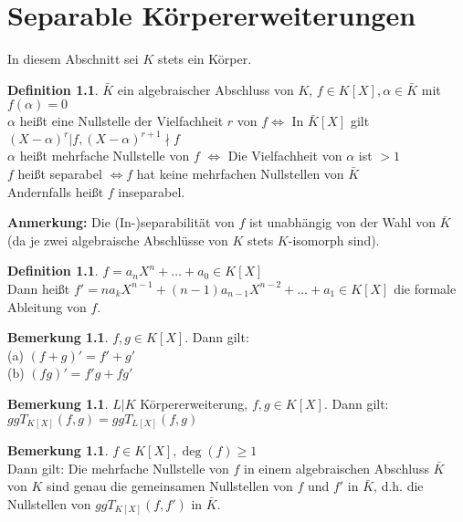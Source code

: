 \documentclass[10pt,a4paper,numbers=endperiod]{scrreprt}
\theoremstyle{definition}
\newtheorem{defi}[satz]{Definition}
\newtheorem{bem}[satz]{Bemerkung}
\begin{document}
\chapter{Separable Körpererweiterungen}
In diesem Abschnitt sei $K$ stets ein Körper.\\

\begin{defi}
	$\bar{K}$ ein algebraischer Abschluss von $K$, $f \in K[X], \alpha
	 \in \bar{K}$ mit $f(\alpha) = 0$\\
	 $\alpha$ heißt eine Nullstelle der Vielfachheit $r$ von $f \Leftrightarrow$ In $\bar{K}[X]$ gilt $(X- \alpha)^r|f, (X-\alpha)^{r+1} \nmid f$\\
	 $\alpha$ heißt mehrfache Nullstelle von $f$ $\Leftrightarrow$ Die Vielfachheit von $\alpha$ ist $> 1$\\
	 $f$ heißt separabel $\Leftrightarrow f$ hat keine mehrfachen Nullstellen von $\bar{K}$\\
	 Andernfalls heißt $f$ inseparabel.
\end{defi}

\textbf{Anmerkung:} Die (In-)separabilität von $f$ ist unabhängig von der Wahl von $\bar{K}$ (da je zwei algebraische Abschlüsse von $K$ stets $K$-isomorph sind).

\begin{defi}
	$f = a_nX^n + \ldots + a_0 \in K[X]$\\
	Dann heißt $f' = na_kX^{n-1} + (n-1)a_{n-1}X^{n-2}+ \ldots + a_1 \in K[X]$ die formale Ableitung von $f$.
\end{defi}

\begin{bem}
	$f,g \in K[X]$. Dann gilt:\\
	(a) $(f+g)' = f' + g'$\\
	(b) $(fg)' = f'g + fg'$
\end{bem}

\begin{bem}
	$L|K$ Körpererweiterung, $f,g \in K[X]$. Dann gilt:\\
	$ggT_{K[X]} (f,g) = ggT_{L[X]}(f,g)$
\end{bem}

\begin{bem}
	$f \in K[X], \deg(f) \geq 1$\\
	Dann gilt: Die mehrfache Nullstelle von $f$ in einem algebraischen Abschluss $\bar{K}$ von $K$ sind genau die gemeinsamen Nullstellen von $f$ und $f'$ in $\bar{K}$, d.h. die Nullstellen von $ggT_{K[X]} (f, f')$ in $\bar{K}$.
\end{bem}
\end{document}
